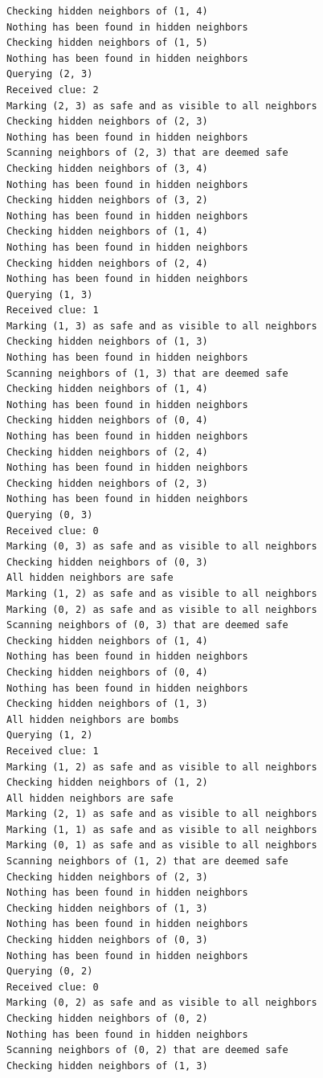 \documentclass[13pt]{report}
\begin{document}
\begin{verbatim}
Checking hidden neighbors of (1, 4)
Nothing has been found in hidden neighbors
Checking hidden neighbors of (1, 5)
Nothing has been found in hidden neighbors
Querying (2, 3)
Received clue: 2
Marking (2, 3) as safe and as visible to all neighbors
Checking hidden neighbors of (2, 3)
Nothing has been found in hidden neighbors
Scanning neighbors of (2, 3) that are deemed safe
Checking hidden neighbors of (3, 4)
Nothing has been found in hidden neighbors
Checking hidden neighbors of (3, 2)
Nothing has been found in hidden neighbors
Checking hidden neighbors of (1, 4)
Nothing has been found in hidden neighbors
Checking hidden neighbors of (2, 4)
Nothing has been found in hidden neighbors
Querying (1, 3)
Received clue: 1
Marking (1, 3) as safe and as visible to all neighbors
Checking hidden neighbors of (1, 3)
Nothing has been found in hidden neighbors
Scanning neighbors of (1, 3) that are deemed safe
Checking hidden neighbors of (1, 4)
Nothing has been found in hidden neighbors
Checking hidden neighbors of (0, 4)
Nothing has been found in hidden neighbors
Checking hidden neighbors of (2, 4)
Nothing has been found in hidden neighbors
Checking hidden neighbors of (2, 3)
Nothing has been found in hidden neighbors
Querying (0, 3)
Received clue: 0
Marking (0, 3) as safe and as visible to all neighbors
Checking hidden neighbors of (0, 3)
All hidden neighbors are safe
Marking (1, 2) as safe and as visible to all neighbors
Marking (0, 2) as safe and as visible to all neighbors
Scanning neighbors of (0, 3) that are deemed safe
Checking hidden neighbors of (1, 4)
Nothing has been found in hidden neighbors
Checking hidden neighbors of (0, 4)
Nothing has been found in hidden neighbors
Checking hidden neighbors of (1, 3)
All hidden neighbors are bombs
Querying (1, 2)
Received clue: 1
Marking (1, 2) as safe and as visible to all neighbors
Checking hidden neighbors of (1, 2)
All hidden neighbors are safe
Marking (2, 1) as safe and as visible to all neighbors
Marking (1, 1) as safe and as visible to all neighbors
Marking (0, 1) as safe and as visible to all neighbors
Scanning neighbors of (1, 2) that are deemed safe
Checking hidden neighbors of (2, 3)
Nothing has been found in hidden neighbors
Checking hidden neighbors of (1, 3)
Nothing has been found in hidden neighbors
Checking hidden neighbors of (0, 3)
Nothing has been found in hidden neighbors
Querying (0, 2)
Received clue: 0
Marking (0, 2) as safe and as visible to all neighbors
Checking hidden neighbors of (0, 2)
Nothing has been found in hidden neighbors
Scanning neighbors of (0, 2) that are deemed safe
Checking hidden neighbors of (1, 3)

\end{verbatim}
\end{document}
